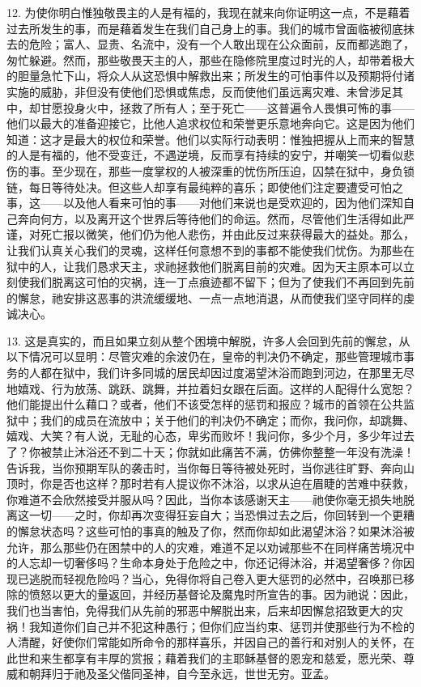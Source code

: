 12. 为使你明白惟独敬畏主的人是有福的，我现在就来向你证明这一点，不是藉着过去所发生的事，而是藉着发生在我们自己身上的事。我们的城市曾面临被彻底抹去的危险；富人、显贵、名流中，没有一个人敢出现在公众面前，反而都逃跑了，匆忙躲避。然而，那些敬畏天主的人，那些在隐修院里度过时光的人，却带着极大的胆量急忙下山，将众人从这恐惧中解救出来；所发生的可怕事件以及预期将付诸实施的威胁，非但没有使他们恐惧或焦虑，反而使他们虽远离灾难、未曾涉足其中，却甘愿投身火中，拯救了所有人；至于死亡——这普遍令人畏惧可怖的事——他们以最大的准备迎接它，比他人追求权位和荣誉更乐意地奔向它。这是因为他们知道：这才是最大的权位和荣誉。他们以实际行动表明：惟独把握从上而来的智慧的人是有福的，他不受变迁，不遇逆境，反而享有持续的安宁，并嘲笑一切看似悲伤的事。至少现在，那些一度掌权的人被深重的忧伤所压迫，囚禁在狱中，身负锁链，每日等待处决。但这些人却享有最纯粹的喜乐；即使他们注定要遭受可怕之事，这——以及他人看来可怕的事——对他们来说也是受欢迎的，因为他们深知自己奔向何方，以及离开这个世界后等待他们的命运。然而，尽管他们生活得如此严谨，对死亡报以微笑，他们仍为他人悲伤，并由此反过来获得最大的益处。那么，让我们认真关心我们的灵魂，这样任何意想不到的事都不能使我们忧伤。为那些在狱中的人，让我们恳求天主，求祂拯救他们脱离目前的灾难。因为天主原本可以立刻使我们脱离这可怕的灾祸，连一丁点痕迹都不留下；但为了使我们不再回到先前的懈怠，祂安排这恶事的洪流缓缓地、一点一点地消退，从而使我们坚守同样的虔诚决心。\newline{}\par

13. 这是真实的，而且如果立刻从整个困境中解脱，许多人会回到先前的懈怠，从以下情况可以显明：尽管灾难的余波仍在，皇帝的判决仍不确定，那些管理城市事务的人都在狱中，我们许多同城的居民却因过度渴望沐浴而跑到河边，在那里无尽地嬉戏、行为放荡、跳跃、跳舞，并拉着妇女跟在后面。这样的人配得什么宽恕？他们能提出什么藉口？或者，他们不该受怎样的惩罚和报应？城市的首领在公共监狱中；我们的成员在流放中；关于他们的判决仍不确定；而你，我问你，却跳舞、嬉戏、大笑？有人说，无耻的心态，卑劣而败坏！我问你，多少个月，多少年过去了？你被禁止沐浴还不到二十天；你就如此痛苦不满，仿佛你整整一年没有洗澡！告诉我，当你预期军队的袭击时，当你每日等待被处死时，当你逃往旷野、奔向山顶时，你是否也这样？那时若有人提议你不沐浴，以求从迫在眉睫的苦难中获救，你难道不会欣然接受并服从吗？因此，当你本该感谢天主——祂使你毫无损失地脱离这一切——之时，你却再次变得狂妄自大；当恐惧过去之后，你回转到一个更糟的懈怠状态吗？这些可怕的事真的触及了你，然而你却如此渴望沐浴？如果沐浴被允许，那么那些仍在困禁中的人的灾难，难道不足以劝诫那些不在同样痛苦境况中的人忘却一切奢侈吗？生命本身处于危险之中，你还记得沐浴，并渴望奢侈？你因现已逃脱而轻视危险吗？当心，免得你将自己卷入更大惩罚的必然中，召唤那已移除的愤怒以更大的量返回，并经历基督论及魔鬼时所宣告的事。因为祂说：因此，我们也当害怕，免得我们从先前的邪恶中解脱出来，后来却因懈怠招致更大的灾祸！我知道你们自己并不犯这种愚行；但你们应当约束、惩罚并使那些行为不检的人清醒，好使你们常能如所命令的那样喜乐，并因自己的善行和对别人的关怀，在此世和来生都享有丰厚的赏报；藉着我们的主耶稣基督的恩宠和慈爱，愿光荣、尊威和朝拜归于祂及圣父偕同圣神，自今至永远，世世无穷。亚孟。\newline{}\par

